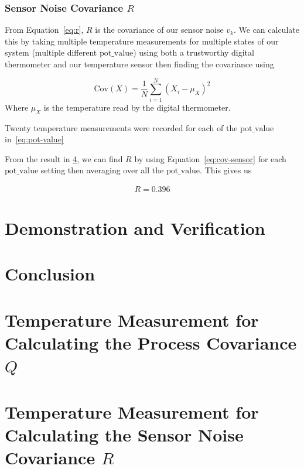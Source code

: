 \documentclass[12pt,a4paper]{article}
\begin{document}
\subsubsection{Sensor Noise Covariance $R$}
From Equation~\eqref{eq:r}, $R$ is the covariance of our sensor noise $v_k$. We can calculate this by taking multiple temperature measurements for multiple states of our system (multiple different $\text{pot\_value}$) using both a trustworthy digital thermometer and our temperature sensor then finding the covariance using

\begin{equation}
    \label{eq:cov-sensor}
    \mathrm{Cov}(X) = \frac{1}{N} \sum_{i=1}^{N} (X_i - \mu_X)^2
\end{equation}
Where $\mu_X$ is the temperature read by the digital thermometer.

Twenty temperature measurements were recorded for each of the $\text{pot\_value}$ in~\eqref{eq:pot-value}

From the result in \ref{app:r}, we can find $R$ by using Equation~\eqref{eq:cov-sensor} for each $\text{pot\_value}$ setting then averaging over all the $\text{pot\_value}$. This gives us

\begin{align*}
    R = 0.396
\end{align*}

\section{Demonstration and Verification}

\section{Conclusion}


\newpage



\newpage
\appendix

\section{\texorpdfstring{Temperature Measurement for Calculating the Process Covariance $Q$}{Temperature Measurement for Calculating the Process Covariance}}
\label{app:q}

\section{\texorpdfstring{Temperature Measurement for Calculating the Sensor Noise Covariance $R$}{Temperature Measurement for Calculating the Sensor Noise Covariance}}
\label{app:r}
\end{document}
